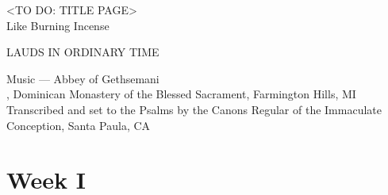 \documentclass[12pt,twocolumn]{book}
\begin{document}
\pagestyle{empty}
\onecolumn

\null\vfill
\begin{center}
  \huge
  <TO DO: TITLE PAGE>\\
  Like Burning Incense
  
  \large\medskip LAUDS IN ORDINARY TIME
\end{center}
\vfill\vfill

\newpage

\null\vfill
\begin{center}
  \vfill\small
  Music --- Abbey of Gethsemani\\
  , Dominican Monastery of the Blessed Sacrament, Farmington Hills, MI\\
  Transcribed and set to the Psalms by the Canons Regular of the Immaculate Conception, Santa Paula, CA
\end{center}


\newpage



\tableofcontents
\setlength{\columnseprule}{0pt}
\null

\twocolumn

\chapter{Week I}
\setlength{\columnseprule}{0.4pt}
\pagestyle{fancy}






\end{document}
